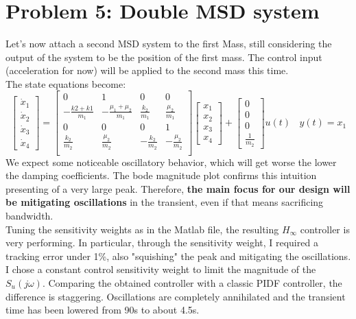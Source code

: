 \documentclass[a4paper, 12pt]{article}
\begin{document}
\section{Problem 5: Double MSD system}
Let's now attach a second MSD system to the first Mass, still considering the output of the system to be the position of the first mass. The control input (acceleration for now) will be applied to the second mass this time.\\
The state equations become:
\begin{equation}
    \begin{bmatrix}
    \dot{x}_1 \\
    \dot{x}_2 \\
    \dot{x}_3 \\
    \dot{x}_4
    \end{bmatrix} =
    \begin{bmatrix}
    0 & 1 & 0 & 0 \\
    -\frac{k2+k1}{m_1} & -\frac{\mu_1+\mu_2}{m_1} &
    \frac{k_2}{m_1} & \frac{\mu_2}{m_1} \\
     0 & 0 & 0 & 1 \\
    \frac{k_2}{m_2} & \frac{\mu_2}{m_2} &
    -\frac{k_2}{m_2} & -\frac{\mu_2}{m_2} \\
    \end{bmatrix}
    \begin{bmatrix}
    x_1 \\
    x_2 \\
    x_3 \\
    x_4
    \end{bmatrix} +
    \begin{bmatrix}
    0\\
    0\\
    0\\
    \frac{1}{m_2}
    \end{bmatrix}
    u(t)\ \ \ \ 
    y(t) = x_1
\end{equation}
We expect some noticeable oscillatory behavior, which will get worse the lower the damping coefficients. The bode magnitude plot confirms this intuition presenting of a very large peak. Therefore, \textbf{the main focus for our design will be mitigating oscillations} in the transient, even if that means sacrificing bandwidth.
\\
Tuning the sensitivity weights as in the Matlab file, the resulting $H_\infty$ controller is very performing. In particular, through the sensitivity weight, I required a tracking error under 1\%, also "squishing" the peak and mitigating the oscillations. I chose a constant control sensitivity weight to limit the magnitude of the $S_u(j\omega)$. Comparing the obtained controller with a classic PIDF controller, the difference is staggering. Oscillations are completely annihilated and the transient time has been lowered from 90s to about 4.5s.
\end{document}
